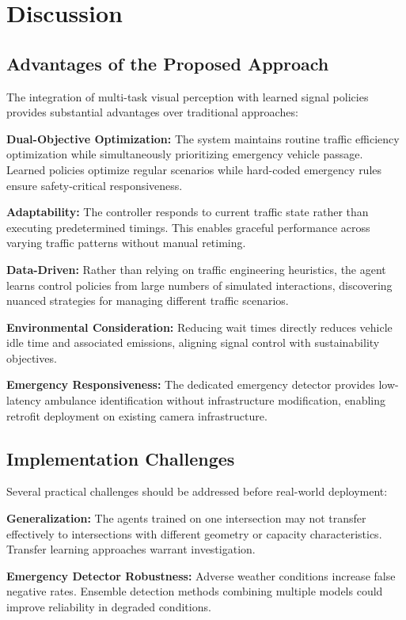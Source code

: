 \documentclass[10pt,conference]{IEEEtran}
\begin{document}
\section{Discussion}

\subsection{Advantages of the Proposed Approach}

The integration of multi-task visual perception with learned signal policies provides substantial advantages over traditional approaches:

\textbf{Dual-Objective Optimization:} The system maintains routine traffic efficiency optimization while simultaneously prioritizing emergency vehicle passage. Learned policies optimize regular scenarios while hard-coded emergency rules ensure safety-critical responsiveness.

\textbf{Adaptability:} The controller responds to current traffic state rather than executing predetermined timings. This enables graceful performance across varying traffic patterns without manual retiming.

\textbf{Data-Driven:} Rather than relying on traffic engineering heuristics, the agent learns control policies from large numbers of simulated interactions, discovering nuanced strategies for managing different traffic scenarios.

\textbf{Environmental Consideration:} Reducing wait times directly reduces vehicle idle time and associated emissions, aligning signal control with sustainability objectives.

\textbf{Emergency Responsiveness:} The dedicated emergency detector provides low-latency ambulance identification without infrastructure modification, enabling retrofit deployment on existing camera infrastructure.

\subsection{Implementation Challenges}

Several practical challenges should be addressed before real-world deployment:

\textbf{Generalization:} The agents trained on one intersection may not transfer effectively to intersections with different geometry or capacity characteristics. Transfer learning approaches warrant investigation.

\textbf{Emergency Detector Robustness:} Adverse weather conditions increase false negative rates. Ensemble detection methods combining multiple models could improve reliability in degraded conditions.
\end{document}
